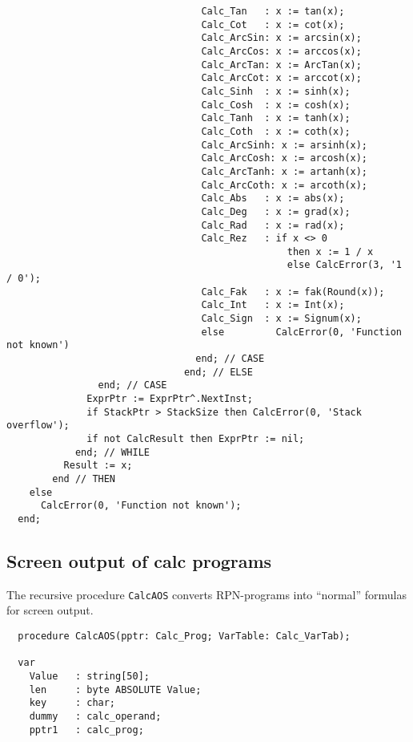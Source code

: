 \begin{refsection}
\begin{lstlisting}
                                  Calc_Tan   : x := tan(x);
                                  Calc_Cot   : x := cot(x);
                                  Calc_ArcSin: x := arcsin(x);
                                  Calc_ArcCos: x := arccos(x);
                                  Calc_ArcTan: x := ArcTan(x);
                                  Calc_ArcCot: x := arccot(x);
                                  Calc_Sinh  : x := sinh(x);
                                  Calc_Cosh  : x := cosh(x);
                                  Calc_Tanh  : x := tanh(x);
                                  Calc_Coth  : x := coth(x);
                                  Calc_ArcSinh: x := arsinh(x);
                                  Calc_ArcCosh: x := arcosh(x);
                                  Calc_ArcTanh: x := artanh(x);
                                  Calc_ArcCoth: x := arcoth(x);
                                  Calc_Abs   : x := abs(x);
                                  Calc_Deg   : x := grad(x);
                                  Calc_Rad   : x := rad(x);
                                  Calc_Rez   : if x <> 0
                                                 then x := 1 / x
                                                 else CalcError(3, '1 / 0');
                                  Calc_Fak   : x := fak(Round(x));
                                  Calc_Int   : x := Int(x);
                                  Calc_Sign  : x := Signum(x);
                                  else         CalcError(0, 'Function not known')
                                 end; // CASE
                               end; // ELSE
                end; // CASE
              ExprPtr := ExprPtr^.NextInst;
              if StackPtr > StackSize then CalcError(0, 'Stack overflow');
              if not CalcResult then ExprPtr := nil;
            end; // WHILE
          Result := x;
        end // THEN
    else
      CalcError(0, 'Function not known');
  end;
\end{lstlisting}

\subsection{Screen output of calc programs}

The recursive procedure \texttt{CalcAOS} converts RPN-programs into ``normal'' formulas for screen output.

\begin{lstlisting}
  procedure CalcAOS(pptr: Calc_Prog; VarTable: Calc_VarTab);

  var
    Value   : string[50];
    len     : byte ABSOLUTE Value;
    key     : char;
    dummy   : calc_operand;
    pptr1   : calc_prog;



\end{lstlisting}
\end{refsection}
